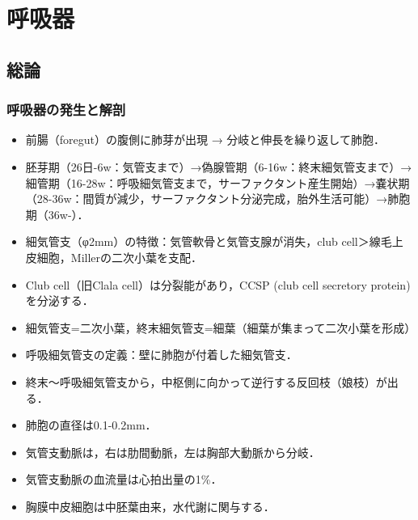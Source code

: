 

\section{呼吸器}
\subsection{総論}
\subsubsection{呼吸器の発生と解剖}
\begin{itemize}
\item 前腸（foregut）の腹側に肺芽が出現 → 分岐と伸長を繰り返して肺胞．
\item 胚芽期（26日-6w：気管支まで）→偽腺管期（6-16w：終末細気管支まで）→細管期（16-28w：呼吸細気管支まで，サーファクタント産生開始）→嚢状期（28-36w：間質が減少，サーファクタント分泌完成，胎外生活可能）→肺胞期（36w-）．
\item 細気管支（φ2mm）の特徴：気管軟骨と気管支腺が消失，club cell＞線毛上皮細胞，Millerの二次小葉を支配．
\item Club cell（旧Clala cell）は分裂能があり，CCSP (club cell secretory protein)を分泌する．
\item 細気管支=二次小葉，終末細気管支=細葉（細葉が集まって二次小葉を形成）
\item 呼吸細気管支の定義：壁に肺胞が付着した細気管支．
\item 終末〜呼吸細気管支から，中枢側に向かって逆行する反回枝（娘枝）が出る．
\item 肺胞の直径は0.1-0.2mm．
\item 気管支動脈は，右は肋間動脈，左は胸部大動脈から分岐．
\item 気管支動脈の血流量は心拍出量の1\%．
\item 胸膜中皮細胞は中胚葉由来，水代謝に関与する．



\end{itemize}


